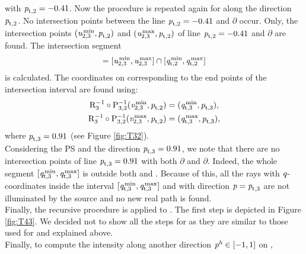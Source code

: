   with $\textit{p}_{\textrm{t,} \textit{$2$}}=-0.41$.
  Now the procedure is repeated again for  along the direction $\textit{p}_{\textrm{t,} \textit{$2$}}$.
  No intersection points between the line $\textit{p}_{\textrm{t,} \textit{$2$}}=-0.41$ and $\partial$ occur. 
Only, the intersection points $(\textit{u}_{2,3}^\textrm{\,min},\textit{p}_{\textrm{t,} \textit{$2$}})$ and $(\textit{u}_{2,3}^\textrm{\,max},\textit{p}_{\textrm{t,} \textit{$2$}})$
  of line $\textit{p}_{\textrm{t,} \textit{$2$}}=-0.41$ and $\partial$ are found.
  The intersection segment 
\begin{equation}
[\variabile{v}_{2,3}^\textrm{\,min},\variabile{v}_{2,3}^\textrm{\,max}] = [\variabile{u}_{2,3}^\textrm{\,min},\variabile{u}_{2,3}^\textrm{\,max}] \cap  [\pos{t,}{$2$}^\textrm{\,min},\pos{t,}{$2$}^\textrm{\,max}]
\end{equation}
is calculated. 
The coordinates on  corresponding to the end points of the intersection interval are found using:
\begin{equation}
\begin{split}
\mathrm{R}_{{3}}^{-1}\circ\mathrm{P}_{{3,2}}^{-1} (\textit{v}_{2,3}^\textrm{\,min},\textit{p}_{\textrm{t,} \textit{$2$}})& = (\textit{q}_{\textrm{t,} \textit{$3$}}^\textrm{\,min},\textit{p}_{\textrm{t,} \textit{$3$}}),\\
\mathrm{R}_{{3}}^{-1}\circ\mathrm{P}_{{3,2}}^{-1} (\textit{v}_{2,3}^\textrm{\,max},\textit{p}_{\textrm{t,} \textit{$2$}})& = (\textit{q}_{\textrm{t,} \textit{$3$}}^\textrm{\,max},\textit{p}_{\textrm{t,} \textit{$3$}}),
\end{split}
\end{equation}  where $ \textit{p}_{\textrm{t,} \textit{$3$}} = 0.91$ (see Figure \ref{fig:T32}). \\ \indent
 Considering the PS  and the direction $\textit{p}_{\textrm{t,} \textit{$3$}}=0.91$, we note that there are no intersection points of line
 $\textit{p}_{\textrm{t,} \textit{$3$}}=0.91$ with both $\partial$ and $\partial$.
 Indeed, the whole segment $[\textit{q}_{\textrm{t,} \textit{$3$}}^\textrm{\,min},\textit{q}_{\textrm{t,} \textit{$3$}}^\textrm{\,max}]$ is outside both
  and . Because of this, all the rays with $\textit{q}$-coordinates inside the interval
 $[\textit{q}_{\textrm{t,} \textit{$3$}}^\textrm{\,min},\textit{q}_{\textrm{t,} \textit{$3$}}^\textrm{\,max}]$
and with direction $\textit{p}= \textit{p}_{\textrm{t,} \textit{$3$}}$ are not illuminated by the source and no new real path is found.
\\ \indent
Finally, the recursive procedure is applied to .
The first step is depicted in Figure \ref{fig:T43}.
 We decided not to show all the steps for  as they are similar to those used for  and explained above.
 \\ \indent Finally, to compute the intensity along another direction $\textit{p}^{\textit{h}}\in[-1,1]$ on ,
